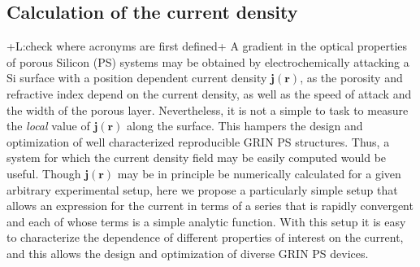 \documentclass{article}
\newcommand{\notaL}[1]{{\color{blue}+L:#1+}}
\begin{document}
\subsection{Calculation of the current density}
\notaL{check where acronyms are first defined}
A gradient in the optical properties of porous Silicon (PS) systems may be
obtained by electrochemically attacking a Si surface with a position dependent current
density ${\bm j(\bm r)}$, as the porosity and refractive index depend on
the current density, as well as the speed of attack and the width of the
porous layer. Nevertheless, it is not a simple to task to measure the
{\em local} value of $\bm j(\bm r)$ along the surface. This hampers the
design and optimization of well characterized reproducible GRIN PS
structures. Thus, a system for which the current density field may be
easily computed would be useful.
Though $\bm j(\bm r)$ may be in principle be numerically calculated for a
given arbitrary experimental setup,  here we propose a particularly
simple setup that allows an expression for the current in terms
of a series that is rapidly convergent and each of whose terms is a
simple analytic function. With this setup it is easy to characterize
the dependence of different properties of interest on the current, and
this allows the design and optimization of diverse GRIN PS devices.
\end{document}
